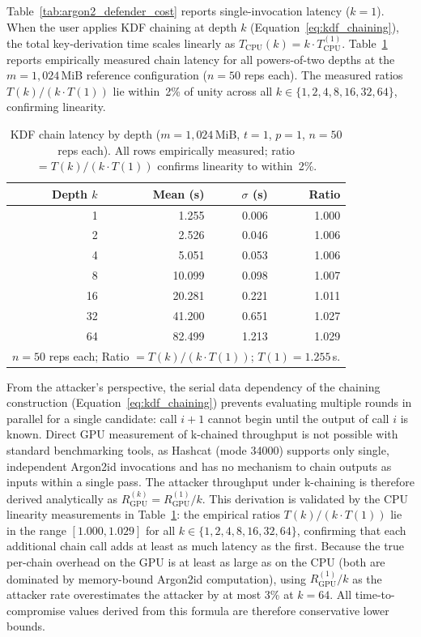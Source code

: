 \documentclass[journal,article,accept,pdftex,moreauthors]{Definitions/mdpi}
\begin{document}
Table~\ref{tab:argon2_defender_cost} reports single-invocation latency ($k=1$). When the user applies KDF chaining at depth $k$ (Equation~\ref{eq:kdf_chaining}), the total key-derivation time scales linearly as $T_\text{CPU}(k) = k \cdot T_\text{CPU}^{(1)}$. Table~\ref{tab:kchain_empirical} reports empirically measured chain latency for all powers-of-two depths at the $m=1{,}024$\,MiB reference configuration ($n=50$ reps each). The measured ratios $T(k)/(k\cdot T(1))$ lie within~2\% of unity across all $k\in\{1,2,4,8,16,32,64\}$, confirming linearity.

\begin{table}[H]
\caption{KDF chain latency by depth ($m=1{,}024$\,MiB, $t=1$, $p=1$, $n=50$ reps each). All rows empirically measured; ratio $= T(k)/(k\cdot T(1))$ confirms linearity to within~2\%.}
\label{tab:kchain_empirical}
\centering
\begin{tabular}{rrrr}
\toprule
\textbf{Depth $k$} & \textbf{Mean (s)} & \textbf{$\sigma$ (s)} & \textbf{Ratio} \\
\midrule
 1 &  1.255 & 0.006 & 1.000 \\
 2 &  2.526 & 0.046 & 1.006 \\
 4 &  5.051 & 0.053 & 1.006 \\
 8 & 10.099 & 0.098 & 1.007 \\
16 & 20.281 & 0.221 & 1.011 \\
32 & 41.200 & 0.651 & 1.027 \\
64 & 82.499 & 1.213 & 1.029 \\
\bottomrule
\multicolumn{4}{l}{\footnotesize $n=50$ reps each; Ratio $= T(k)/(k\cdot T(1))$; $T(1)=1.255$\,s.}
\end{tabular}
\end{table}

From the attacker's perspective, the serial data dependency of the chaining construction (Equation~\ref{eq:kdf_chaining}) prevents evaluating multiple rounds in parallel for a single candidate: call $i+1$ cannot begin until the output of call $i$ is known. Direct GPU measurement of k-chained throughput is not possible with standard benchmarking tools, as Hashcat (mode 34000) supports only single, independent Argon2id invocations and has no mechanism to chain outputs as inputs within a single pass. The attacker throughput under k-chaining is therefore derived analytically as $R_\text{GPU}^{(k)} = R_\text{GPU}^{(1)} / k$. This derivation is validated by the CPU linearity measurements in Table~\ref{tab:kchain_empirical}: the empirical ratios $T(k)/(k \cdot T(1))$ lie in the range $[1.000, 1.029]$ for all $k \in \{1,2,4,8,16,32,64\}$, confirming that each additional chain call adds at least as much latency as the first. Because the true per-chain overhead on the GPU is at least as large as on the CPU (both are dominated by memory-bound Argon2id computation), using $R_\text{GPU}^{(1)}/k$ as the attacker rate overestimates the attacker by at most 3\% at $k=64$. All time-to-compromise values derived from this formula are therefore conservative lower bounds.
\end{document}
